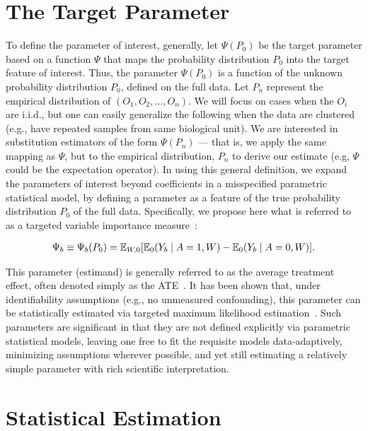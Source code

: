 \section{The Target Parameter}\label{data}

To define the parameter of interest, generally, let $\Psi(P_{0})$ be the
target parameter based on a function $\Psi$ that maps the probability
distribution $P_{0}$ into the target feature of interest. Thus, the parameter
$\Psi(P_{0})$ is a function of the unknown probability distribution $P_{0}$,
defined on the full data. Let $P_{n}$ represent the  empirical distribution of
$(O_{1},O_{2}, \dots, O_{n})$. We will focus on cases when the $O_i$ are
i.i.d., but one can easily generalize the following when the data are clustered
(e.g., have repeated samples from same biological unit). We are interested in
substitution estimators of the form $\Psi(P_{n})$ --- that is, we apply the same
mapping as $\Psi$, but to the empirical distribution, $P_n$ to derive our
estimate (e.g, $\Psi$ could be the expectation operator). In using this general
definition, we expand the parameters of interest beyond coefficients in a
misspecified parametric statistical model, by defining a parameter as a feature
of the true probability distribution $P_{0}$ of the full data. Specifically, we
propose here what is referred to as a targeted variable importance
measure~\cite{bembom2009biomarker}:

\begin{eqnarray}
\label{targetparam}
\Psi_{b} \equiv \Psi_{b}(P_{0}) = \mathbb{E} _{W,0}[\mathbb{E}_{0}(Y_{b} \mid A = 1, W) - \mathbb{E}_{0}(Y_{b} \mid A = 0, W)].
\end{eqnarray}

This parameter (estimand) is generally referred to as the average treatment
effect, often denoted simply as the ATE~\cite{rosenbaum1983central}. It has
been shown that, under identifiability assumptions (e.g., no unmeasured
confounding), this parameter can be statistically estimated via targeted
maximum likelihood estimation~\cite{van2011targeted}. Such parameters are
significant in that they are not defined explicitly via parametric statistical
models, leaving one free to fit the requisite models data-adaptively, minimizing
assumptions wherever possible, and yet still estimating a relatively simple
parameter with rich scientific interpretation.

\section{Statistical Estimation}\label{estimation}

